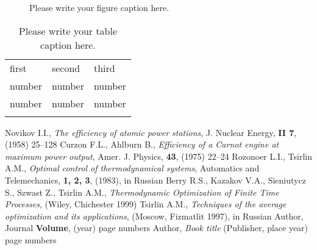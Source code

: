 \documentclass[epjST]{svjour}
\begin{document}
\begin{figure}
\caption{Please write your figure caption here.}
\label{fig:1}       %
\end{figure}
%
\begin{table}
\caption{Please write your table caption here.}
\label{tab:1}       %
\begin{tabular}{lll}
\hline\noalign{\smallskip}
first & second & third  \\
\noalign{\smallskip}\hline\noalign{\smallskip}
number & number & number \\
number & number & number \\
\noalign{\smallskip}\hline
\end{tabular}
\end{table}
%
\begin{thebibliography}{}
Novikov I.I., \textit{The efficiency of atomic power stations}, J. Nuclear Energy, \textbf{II 7}, (1958) 25--128
Curzon F.L., Ahlburn B., \textit{Efficiency of a Carnot engine at maximum power output}, Amer. J. Physics, \textbf{43}, (1975) 22--24
Rozonoer L.I., Tsirlin A.M., \textit{Optimal control of thermodynamical systems}, Automatics and Telemechanics, \textbf{1, 2, 3}, (1983), in Russian
Berry R.S., Kazakov V.A., Sieniutycz S., Szwast Z., Tsirlin A.M., \textit{Thermodynamic Optimization of Finite Time Processes}, (Wiley, Chichester 1999)
Tsirlin A.M., \textit{Techniques of the average optimization and its applications}, (Moscow, Fizmatlit 1997), in Russian
Author, Journal \textbf{Volume}, (year) page numbers
Author, \textit{Book title} (Publisher, place year) page numbers
\end{thebibliography}
\end{document}
